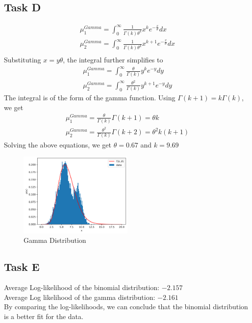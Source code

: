 \subsection*{Task D}
\begin{align*}
	\mu_1^{Gamma} = \int_{0}^{\infty} \frac{1}{\Gamma(k)\theta^k}x^{k}e^{-\frac{x}{\theta}}dx     \\
	\mu_2^{Gamma} = \int_{0}^{\infty} \frac{1}{\Gamma(k)\theta^k}x^{k + 1}e^{-\frac{x}{\theta}}dx \\
\end{align*}
Substituting $x = y\theta$, the integral further simplifies to
\begin{align*}
	\mu_1^{Gamma} = \int_{0}^{\infty} \frac{\theta}{\Gamma(k)}y^{k}e^{-y}dy \\
	\mu_2^{Gamma} = \int_{0}^{\infty} \frac{\theta^2}{\Gamma(k)}y^{k + 1}e^{-y}dy
\end{align*}
The integral is of the form of the gamma function. Using $\Gamma(k+1) = k\Gamma(k)$, we get
\begin{align*}
	\mu_1^{Gamma} = \frac{\theta}{\Gamma(k)}\Gamma(k+1) = \theta k \\
	\mu_2^{Gamma} = \frac{\theta^2}{\Gamma(k)}\Gamma(k+2) = \theta^2 k(k+1)
\end{align*}
Solving the above equations, we get $\theta = 0.67$ and $k = 9.69$
\begin{figure}
	\centering
	\includegraphics[width=0.5\textwidth]{images/3d.png}
	\caption{Gamma Distribution}
\end{figure}
\subsection*{Task E}
Average Log-likelihood of the binomial distribution: $-2.157$ \\
Average Log likelihood of the gamma distribution: $-2.161$ \\
By comparing the log-likelihoods, we can conclude that the binomial distribution is a better fit for the data.

